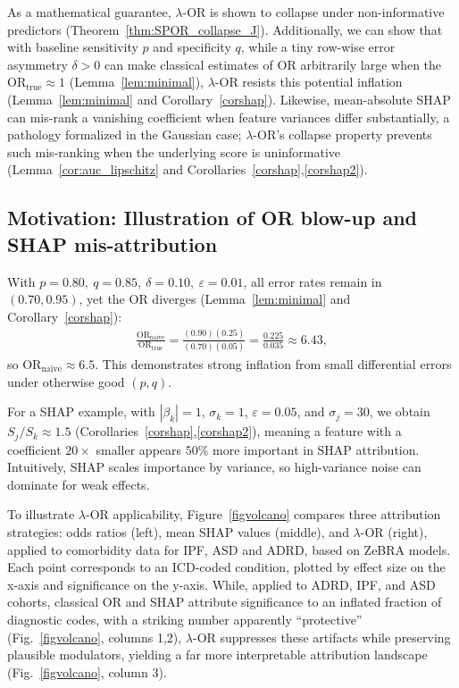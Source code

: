 \documentclass[pdflatex,sn-mathphys-num]{sn-jnl}%
\def\EQSP{3pt}
\newcommand{\cgather}[2][\EQSP]{\begingroup\setlength\abovedisplayskip{#1}\setlength\belowdisplayskip{#1}\begin{gather} #2 \end{gather}\endgroup\noindent}
\def\zcor{ZeBRA\xspace}
\newcommand{\SPOR}{\textrm{$\lambda$-OR}}
\theoremstyle{thmstyleone}%
\theoremstyle{thmstyletwo}%
\theoremstyle{thmstylethree}%
\begin{document}
As a mathematical guarantee, $\SPOR$ is shown to collapse under non-informative predictors (Theorem~\ref{thm:SPOR_collapse_J}). Additionally, we can show that with baseline sensitivity $p$ and specificity $q$, while  a tiny row-wise error asymmetry $\delta>0$ can make classical estimates of  $\mathrm{OR}$  arbitrarily large when the  $\mathrm{OR}_{\text{true}}\approx 1$ (Lemma~\ref{lem:minimal}), $\SPOR$ resists  this potential  inflation  (Lemma~\ref{lem:minimal} and Corollary~\ref{corshap}). Likewise, mean-absolute SHAP can mis-rank a vanishing coefficient when feature variances differ substantially, a pathology formalized in the Gaussian case; $\SPOR$’s collapse property prevents such mis-ranking when the underlying score is uninformative (Lemma~\ref{cor:auc_lipschitz} and Corollaries~\ref{corshap},\ref{corshap2}).
   
\subsection{Motivation: Illustration of OR blow-up and SHAP mis-attribution}
With $p=0.80,\ q=0.85,\ \delta=0.10,\ \varepsilon=0.01$, all error rates remain in $(0.70,0.95)$, yet the OR diverges (Lemma~\ref{lem:minimal} and Corollary~\ref{corshap}):
\cgather{
\frac{\mathrm{OR}_{\text{naive}}}{\mathrm{OR}_{\text{true}}}
=\frac{(0.90)(0.25)}{(0.70)(0.05)}
=\frac{0.225}{0.035}\approx 6.43,
}
so $\mathrm{OR}_{\text{naive}}\approx 6.5$.  
This demonstrates strong inflation from small differential errors
under otherwise good $(p,q)$.

For a SHAP example, with $|\beta_k| = 1$, $\sigma_k = 1$, $\varepsilon = 0.05$, and $\sigma_j = 30$, we obtain $S_j/S_k \approx 1.5$ (Corollaries~\ref{corshap},\ref{corshap2}), meaning a feature with a coefficient $20\times$ smaller appears $50\%$ more important in SHAP attribution. Intuitively, SHAP scales importance by variance, so high-variance noise can dominate  for weak effects.

To illustrate $\SPOR$ applicability, Figure~\ref{figvolcano} compares three attribution strategies:  odds ratios (left), mean SHAP values (middle), and $\SPOR$ (right), applied to comorbidity data for IPF, ASD and ADRD, based on \zcor models. Each point corresponds to an ICD-coded condition, plotted by effect size on the x-axis and significance on the y-axis. While, applied to ADRD, IPF, and ASD cohorts, classical OR and SHAP attribute significance to an inflated fraction of diagnostic codes, with a striking number apparently “protective” (Fig.~\ref{figvolcano}, columns 1,2), $\SPOR$ suppresses these artifacts while preserving  plausible modulators, yielding a far more interpretable attribution landscape (Fig.~\ref{figvolcano}, column 3). 
\end{document}
